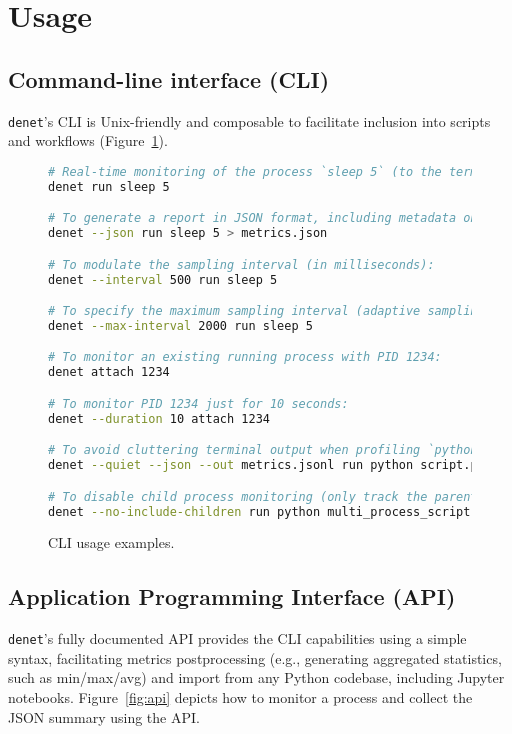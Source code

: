 \documentclass[10pt]{article}
\begin{document}
\section*{Usage}

\subsection*{Command-line interface (CLI)}

\texttt{denet}'s CLI is Unix-friendly \cite{raymond1999cathedral} and composable to facilitate inclusion into scripts and workflows (Figure~\ref{fig:cli}).\\

\begin{figure}[H]

\begin{lstlisting}[frame=single,language=bash]
# Real-time monitoring of the process `sleep 5` (to the terminal):
denet run sleep 5

# To generate a report in JSON format, including metadata on the first line:
denet --json run sleep 5 > metrics.json

# To modulate the sampling interval (in milliseconds):
denet --interval 500 run sleep 5

# To specify the maximum sampling interval (adaptive sampling mode):
denet --max-interval 2000 run sleep 5

# To monitor an existing running process with PID 1234:
denet attach 1234

# To monitor PID 1234 just for 10 seconds:
denet --duration 10 attach 1234

# To avoid cluttering terminal output when profiling `python script.py`:
denet --quiet --json --out metrics.jsonl run python script.py

# To disable child process monitoring (only track the parent process):
denet --no-include-children run python multi_process_script.py
\end{lstlisting}

    \caption{CLI usage examples.}
    \label{fig:cli}
\end{figure}

\subsection*{Application Programming Interface (API)}

\texttt{denet}’s fully documented API provides the CLI capabilities using a simple syntax, facilitating metrics postprocessing (e.g., generating aggregated statistics, such as min/max/avg) and import from any Python codebase, including Jupyter notebooks. Figure~\ref{fig:api} depicts how to monitor a process and collect the JSON summary using the API.
\end{document}
